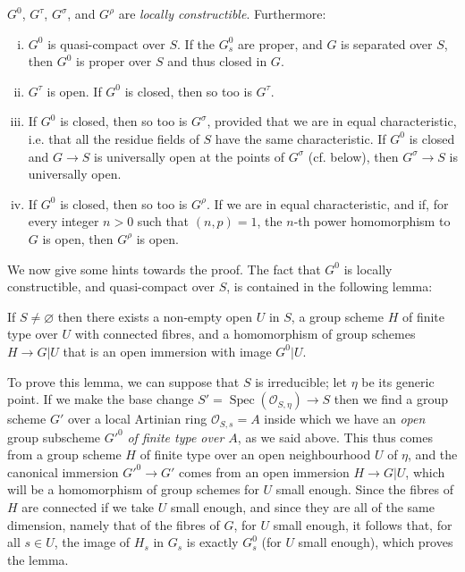 \begin{theorem}\label{fga3.vi-1-theorem-1.1}
    $G^0$, $G^\tau$, $G^\sigma$, and $G^\rho$ are \emph{locally constructible}.
    Furthermore:

    \begin{enumerate}[i.]
        \item $G^0$ is quasi-compact over $S$.
              If the $G_s^0$ are proper, and $G$ is separated over $S$, then $G^0$ is proper over $S$ and thus closed in $G$.
        \item $G^\tau$ is open.
              If $G^0$ is closed, then so too is $G^\tau$.
        \item If $G^0$ is closed, then so too is $G^\sigma$, provided that we are in equal characteristic, i.e. that all the residue fields of $S$ have the same characteristic.
              If $G^0$ is closed and $G\to S$ is universally open at the points of $G^\sigma$ (cf.  below), then $G^\sigma\to S$ is universally open.
        \item If $G^0$ is closed, then so too is $G^\rho$.
              If we are in equal characteristic, and if, for every integer $n>0$ such that $(n,p)=1$, the $n$-th power homomorphism to $G$ is open, then $G^\rho$ is open.
    \end{enumerate}
\end{theorem}

We now give some hints towards the proof.
The fact that $G^0$ is locally constructible, and quasi-compact over $S$, is contained in the following lemma:


\begin{lemma}\label{fga3.vi-1-lemma-1.2}
    If $S\neq\varnothing$ then there exists a non-empty open $U$ in $S$, a group scheme $H$ of finite type over $U$ with connected fibres, and a homomorphism of group schemes $H\to G|U$ that is an open immersion with image $G^0|U$.
\end{lemma}

\begin{cproof}
    To prove this lemma, we can suppose that $S$ is irreducible;
    let $\eta$ be its generic point.
    If we make the base change $S'=\operatorname{Spec}(\mathcal{O}_{S,\eta})\to S$ then we find a group scheme $G'$ over a local Artinian ring $\mathcal{O}_{S,s}=A$ inside which we have an \emph{open} group subscheme ${G'}^0$ \emph{of finite type over $A$}, as we said above.
    This thus comes from a group scheme $H$ of finite type over an open neighbourhood $U$ of $\eta$, and the canonical immersion ${G'}^0\to G'$ comes from an open immersion $H\to G|U$, which will be a homomorphism of group schemes for $U$ small enough.
    Since the fibres of $H$ are connected if we take $U$ small enough, and since they are all of the same dimension, namely that of the fibres of $G$, for $U$ small enough, it follows that, for all $s\in U$, the image of $H_s$ in $G_s$ is exactly $G_s^0$ (for $U$ small enough), which proves the lemma.
\end{cproof}

